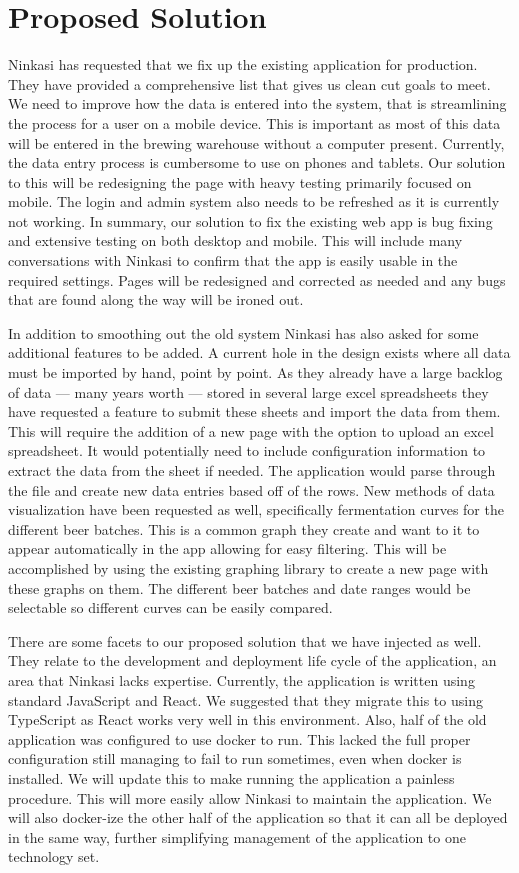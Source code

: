 \documentclass[draftclsnofoot,onecolumn,letterpaper,compsoc,10pt]{IEEEtran}
\begin{document}
\section{Proposed Solution}
Ninkasi has requested that we fix up the existing application for production.  They have provided a comprehensive list that gives us clean cut goals to meet.  We need to improve how the data is entered into the system, that is streamlining the process for a user on a mobile device.  This is important as most of this data will be entered in the brewing warehouse without a computer present.  Currently, the data entry process is cumbersome to use on phones and tablets.  Our solution to this will be redesigning the page with heavy testing primarily focused on mobile.  The login and admin system also needs to be refreshed as it is currently not working.  In summary, our solution to fix the existing web app is bug fixing and extensive testing on both desktop and mobile.  This will include many conversations with Ninkasi to confirm that the app is easily usable in the required settings.  Pages will be redesigned and corrected as needed and any bugs that are found along the way will be ironed out.

In addition to smoothing out the old system Ninkasi has also asked for some additional features to be added.  A current hole in the design exists where all data must be imported by hand, point by point.  As they already have a large backlog of data --- many years worth --- stored in several large excel spreadsheets they have requested a feature to submit these sheets and import the data from them.  This will require the addition of a new page with the option to upload an excel spreadsheet.  It would potentially need to include configuration information to extract the data from the sheet if needed.  The application would parse through the file and create new data entries based off of the rows.  New methods of data visualization have been requested as well, specifically fermentation curves for the different beer batches.  This is a common graph they create and want to it to appear automatically in the app allowing for easy filtering.  This will be accomplished by using the existing graphing library to create a new page with these graphs on them.  The different beer batches and date ranges would be selectable so different curves can be easily compared.

There are some facets to our proposed solution that we have injected as well.  They relate to the development and deployment life cycle of the application, an area that Ninkasi lacks expertise.  Currently, the application is written using standard JavaScript and React.  We suggested that they migrate this to using TypeScript as React works very well in this environment.  Also, half of the old application was configured to use docker to run.  This lacked the full proper configuration still managing to fail to run sometimes, even when docker is installed.  We will update this to make running the application a painless procedure.  This will more easily allow Ninkasi to maintain the application.  We will also docker-ize the other half of the application so that it can all be deployed in the same way, further simplifying management of the application to one technology set.
\end{document}
